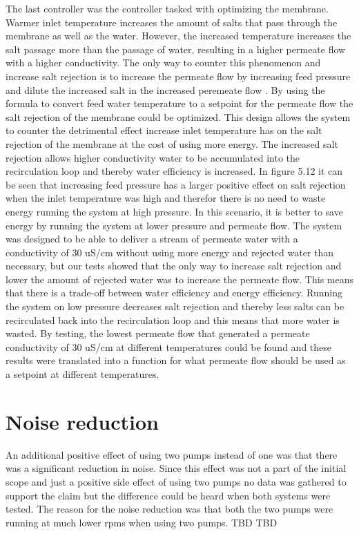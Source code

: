The last controller was the controller tasked with optimizing the membrane. Warmer inlet temperature increases the amount of salts that pass through the membrane as well as the water. However, the increased temperature increases the salt passage more than the passage of water, resulting in a higher permeate flow with a higher conductivity. The only way to counter this phenomenon and increase salt rejection is to increase the permeate flow by increasing feed pressure and dilute the increased salt in the increased peremeate flow . By using the formula to convert feed water temperature to a setpoint for the permeate flow the salt rejection of the membrane could be optimized. This design allows the system to counter the detrimental effect increase inlet temperature has on the salt rejection of the membrane at the cost of using more energy. The increased salt rejection allows higher conductivity water to be accumulated into the recirculation loop and thereby water efficiency is increased. In figure 5.12 it can be seen that increasing feed pressure has a larger positive effect on salt rejection when the inlet temperature was high and therefor there is no need to waste energy running the system at high pressure. In this scenario, it is better to save energy by running the system at lower pressure and permeate flow. 
The system was designed to be able to deliver a stream of permeate water with a conductivity of 30 uS/cm without using more energy and rejected water than necessary, but our tests showed that the only way to increase salt rejection and lower the amount of rejected water was to increase the permeate flow. This means that there is a trade-off between water efficiency and energy efficiency. Running the system on low pressure decreases salt rejection and thereby less salts can be recirculated back into the recirculation loop and this means that more water is wasted. By testing, the lowest permeate flow that generated a permeate conductivity of 30 uS/cm at different temperatures could be found and these results were translated into a function for what permeate flow should be used as a setpoint at different temperatures. 

\section{Noise reduction}

An additional positive effect of using two pumps instead of one was that there was a significant reduction in noise. Since this effect was not a part of the initial scope and just a positive side effect of using two pumps no data was gathered to support the claim but the difference could be heard when both systems were tested. The reason for the noise reduction was that both the two pumps were running at much lower rpms when using two pumps. TBD TBD 

